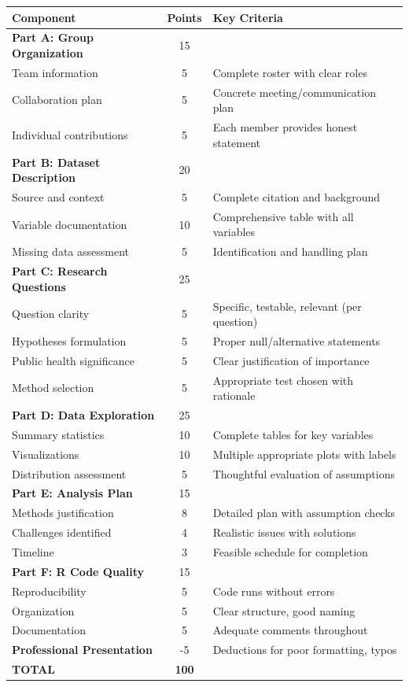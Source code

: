 \documentclass[11pt]{article}
\begin{document}
\begin{table}[h]
\centering
\begin{tabular}{lcl}
\toprule
\textbf{Component} & \textbf{Points} & \textbf{Key Criteria} \\
\midrule
\textbf{Part A: Group Organization} & 15 & \\
\quad Team information & 5 & Complete roster with clear roles \\
\quad Collaboration plan & 5 & Concrete meeting/communication plan \\
\quad Individual contributions & 5 & Each member provides honest statement \\
\midrule
\textbf{Part B: Dataset Description} & 20 & \\
\quad Source and context & 5 & Complete citation and background \\
\quad Variable documentation & 10 & Comprehensive table with all variables \\
\quad Missing data assessment & 5 & Identification and handling plan \\
\midrule
\textbf{Part C: Research Questions} & 25 & \\
\quad Question clarity & 5 & Specific, testable, relevant (per question) \\
\quad Hypotheses formulation & 5 & Proper null/alternative statements \\
\quad Public health significance & 5 & Clear justification of importance \\
\quad Method selection & 5 & Appropriate test chosen with rationale \\
\midrule
\textbf{Part D: Data Exploration} & 25 & \\
\quad Summary statistics & 10 & Complete tables for key variables \\
\quad Visualizations & 10 & Multiple appropriate plots with labels \\
\quad Distribution assessment & 5 & Thoughtful evaluation of assumptions \\
\midrule
\textbf{Part E: Analysis Plan} & 15 & \\
\quad Methods justification & 8 & Detailed plan with assumption checks \\
\quad Challenges identified & 4 & Realistic issues with solutions \\
\quad Timeline & 3 & Feasible schedule for completion \\
\midrule
\textbf{Part F: R Code Quality} & 15 & \\
\quad Reproducibility & 5 & Code runs without errors \\
\quad Organization & 5 & Clear structure, good naming \\
\quad Documentation & 5 & Adequate comments throughout \\
\midrule
\textbf{Professional Presentation} & -5 & Deductions for poor formatting, typos \\
\bottomrule
\textbf{TOTAL} & \textbf{100} & \\
\bottomrule
\end{tabular}
\end{table}
\end{document}
